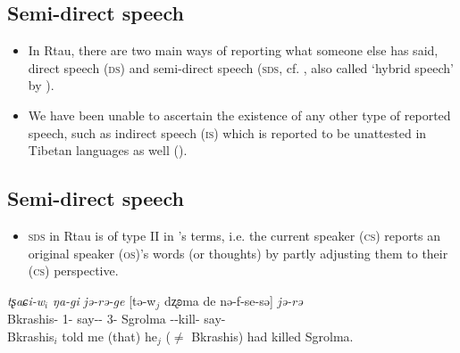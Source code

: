 \documentclass[11pt]{article}
\newcommand{\ipa}[1]{{\textit{\phon #1}}} %
\newcommand{\ipapl}[1]{{\phondroit #1}}
\begin{document}
\subsection{Semi-direct speech}

\begin{itemize}

\item In Rtau, there are two main ways of reporting what someone else has said, direct speech (\textsc{ds}) and semi-direct speech (\textsc{sds}, cf. \citealp{aikhenvald08semidirect}, also called `hybrid speech' by \citealp{tournadre08conjunct}). 


\item We have been unable to ascertain the existence of any other type of reported speech, such as indirect speech (\textsc{is}) which is reported to be unattested in Tibetan languages as well (\citealp{tournadre08conjunct}).

\end{itemize}



\subsection{Semi-direct speech}

\begin{itemize}
 \item \textsc{sds} in Rtau is of type II in \cite{aikhenvald08semidirect}'s terms, i.e. the current speaker (\textsc{cs}) reports an original speaker (\textsc{os})'s words (or thoughts) by partly adjusting them to their (\textsc{cs}) perspective. 

\end{itemize}

\begin{exe}
\ex \label{ex:1b}
\gll
	\ipa{tʂaɕi-w}$_i$ \ipa{ŋa-gi}	\ipa{jə-rə-ge} [\ipapl{tə-w}$_j$	\ipapl{dʐʚma} 	\ipapl{de} \ipapl{nə-f-se-sə}] \ipa{jə-rə}  \\
	{Bkrashis-\erg} {1\sg-\dat} {say-\const-\conv} {3\sg-\erg} Sgrolma {\dem} {\prf-\inv-kill-\evid}  say-\const\\ 
	\glt Bkrashis$_i$ told me (that) he$_j$ ($\ne$ Bkrashis) had killed Sgrolma.
\end{exe}
\end{document}
